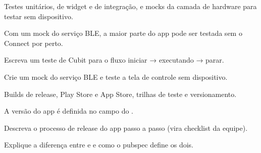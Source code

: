 Testes unitários, de widget e de integração, e mocks da camada de hardware para testar sem dispositivo.

\begin{noproduto}
Com um mock do serviço BLE, a maior parte do app pode ser testada sem o Connect por perto.
\end{noproduto}

\begin{paraestudar}
  \item {}
  \item {}
\end{paraestudar}

\begin{pratique}
  \item Escreva um teste de Cubit para o fluxo iniciar → executando → parar.
  \item Crie um mock do serviço BLE e teste a tela de controle sem dispositivo.
\end{pratique}

Builds de release, Play Store e App Store, trilhas de teste e versionamento.

\begin{noproduto}
A versão do app é definida no campo  do .
\end{noproduto}

\begin{paraestudar}
  \item {}
\end{paraestudar}

\begin{pratique}
  \item Descreva o processo de release do app passo a passo (vira checklist da equipe).
  \item Explique a diferença entre  e  e como o pubspec define os dois.
\end{pratique}
